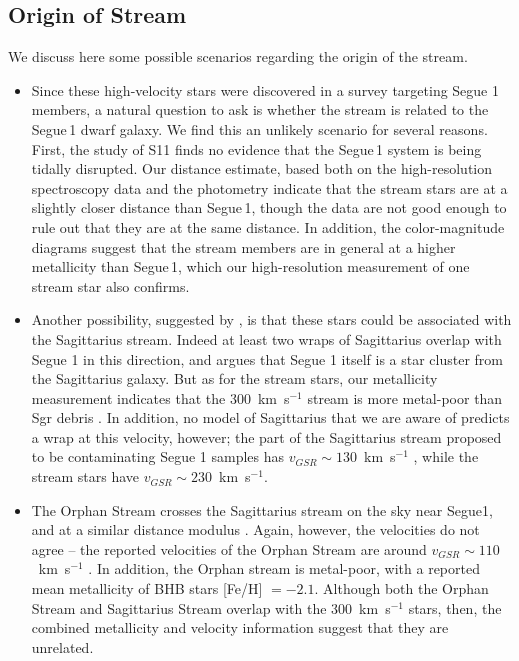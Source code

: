 \documentclass[manuscript]{aastex}
\begin{document}
\subsection{Origin of Stream}
We discuss here some possible scenarios regarding the origin of the stream.

\begin{itemize}
\item Since these high-velocity stars were discovered in a survey targeting Segue 1 members, a natural question to ask is whether the stream is related to the Segue\,1 dwarf galaxy. We find this an unlikely scenario for several reasons. First, the study of S11 finds no evidence that the Segue\,1 system is being tidally disrupted. Our distance estimate, based both on the high-resolution spectroscopy data and the photometry indicate that the stream stars are at a slightly closer distance than Segue\,1, though the data are not good enough to rule out that they are at the same distance. In addition, the color-magnitude diagrams suggest that the stream members are in general at a higher metallicity than Segue\,1, which our high-resolution measurement of one stream star also confirms. 

\item Another possibility, suggested by \citet{Geha2009}, is that these stars could be associated with the Sagittarius stream. Indeed at least two wraps of Sagittarius overlap with Segue 1 in this direction, and \citet{Niederste-Ostholt2009} argues that Segue 1 itself is a star cluster from the Sagittarius galaxy. But as for the stream stars, our metallicity measurement indicates that the 300~km~s$^{-1}$ stream is more metal-poor than Sgr debris \citep{Chou2007}. In addition, no model of Sagittarius that we are aware of predicts a wrap at this velocity, however; the part of the Sagittarius stream proposed to be contaminating Segue 1 samples has $v_{GSR} \sim 130$~km~s$^{-1}$ \citep{Niederste-Ostholt2009}, while the stream stars have $v_{GSR} \sim 230$~km~s$^{-1}$. 

\item The Orphan Stream \citep{Belokurov2007b} crosses the Sagittarius stream on the sky near Segue1, and at a similar distance modulus . Again, however, the velocities do not agree -- the reported velocities of the Orphan Stream are around $v_{GSR} \sim 110$~km~s$^{-1}$ \citep{Newberg2010}. In addition, the Orphan stream is metal-poor, with a reported mean metallicity of BHB stars [Fe/H] $ = -2.1$. Although both the Orphan Stream and Sagittarius Stream overlap with the 300~km~s$^{-1}$ stars, then, the combined metallicity and velocity information suggest that they are unrelated.


\end{itemize}
\end{document}
